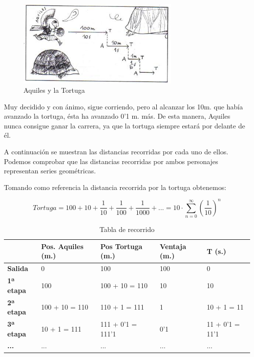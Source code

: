 \documentclass[a4paper,12pt]{article}
\begin{document}
   \begin{figure}[h]
   \begin{center}
   \includegraphics[width=8cm]{Imagenes/aquiles2.jpg}
   \end{center}
   \caption{Aquiles y la Tortuga}
   \label{fig:playa}
   \end{figure}
   
   Muy decidido y con ánimo, sigue corriendo, pero al alcanzar los 10m.
   que había avanzado la tortuga, ésta ha avanzado 0'1 m. más.  
   De esta manera, Aquiles nunca consigue ganar la carrera, ya que la tortuga
   siempre estará por delante de él. 
   
   A continuación se muestran las distancias recorridas por cada uno de ellos. Podemos
   comprobar que las distancias recorridas por ambos personajes representan
   series geométricas.
   
   Tomando como referencia la distancia recorrida por la tortuga obtenemos:
   
   \begin{equation}
   Tortuga = 100 + 10 + \frac{1}{10} + \frac{1}{100} + \frac{1}{1000} + ... = 10 \cdot \sum_{n=0}^\infty (\frac{1}{10})^n
   \end{equation}

   \begin{table}[h]
   \begin{center}
   \begin{tabular}{|l|l|l|l|l|}
   \hline
                     & \textbf{Pos. Aquiles (m.)} &  \textbf{Pos Tortuga (m.)}  & \textbf{Ventaja (m.)} & \textbf{T (s.)} \\ \hline
   \textbf{Salida}   & 0                          &  100                        & 100                   & 0                \\ \hline
   \textbf{1ª etapa} & 100                        &  100 + 10 = 110             & 10                    & 10               \\ \hline
   \textbf{2ª etapa} & 100 + 10 = 110             &  110 + 1 = 111              & 1                     & 10 + 1 = 11      \\ \hline 
   \textbf{3ª etapa} & 10 + 1 = 111               &  111 + 0'1 = 111'1          & 0'1                   & 11 + 0'1 = 11'1  \\ \hline 
   \textbf{...}      & ...                        &  ...                        & ...                   & ...              \\ \hline 
 
   \end{tabular}
   \end{center}
   \caption{Tabla de recorrido}
   \label{tab:ejemplo}
   \end{table} 
\end{document}
